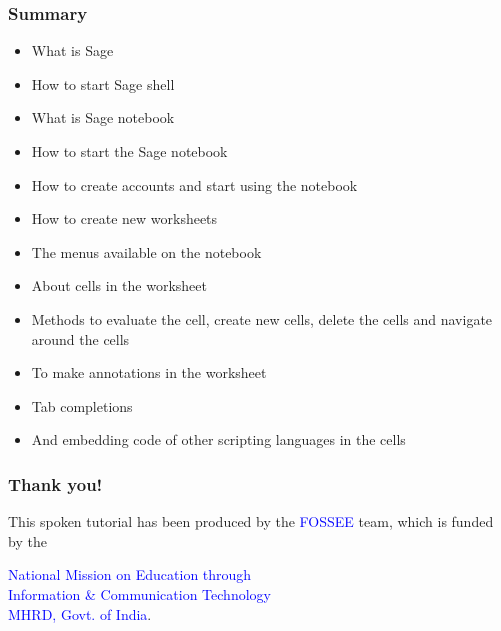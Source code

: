 \documentclass[presentation]{beamer}
\begin{document}
\begin{frame}
\frametitle{Summary}
\label{sec-3}

\begin{itemize}
\item What is Sage
\item How to start Sage shell
\item What is Sage notebook
\item How to start the Sage notebook
\item How to create accounts and start using the notebook
\item How to create new worksheets
\item The menus available on the notebook
\item About cells in the worksheet
\item Methods to evaluate the cell, create new cells, delete the cells
    and navigate around the cells
\item To make annotations in the worksheet
\item Tab completions
\item And embedding code of other scripting languages in the cells
\end{itemize}
\end{frame}
\begin{frame}
\frametitle{Thank you!}
\label{sec-4}

  \begin{block}{}
  \begin{center}
  This spoken tutorial has been produced by the
  \textcolor{blue}{FOSSEE} team, which is funded by the 
  \end{center}
  \begin{center}
    \textcolor{blue}{National Mission on Education through \\
      Information \& Communication Technology \\ 
      MHRD, Govt. of India}.
  \end{center}  
  \end{block}
\end{frame}
\end{document}

